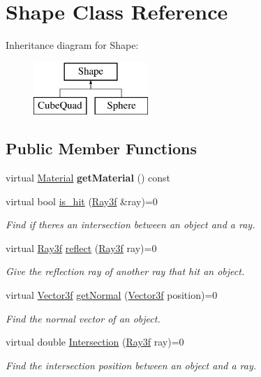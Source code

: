 \hypertarget{class_shape}{}\section{Shape Class Reference}
\label{class_shape}
Inheritance diagram for Shape\+:\begin{figure}[H]
\begin{center}
\leavevmode
\includegraphics[height=2.000000cm]{class_shape}
\end{center}
\end{figure}
\subsection*{Public Member Functions}
\begin{DoxyCompactItemize}
\item 
\mbox{\label{class_shape_ac4d71163e542213ea286344300e16c6f}} 
virtual \mbox{\hyperlink{class_material}{Material}} {\bfseries get\+Material} () const
\item 
virtual bool \mbox{\hyperlink{class_shape_ab443b81b74cfb1d248d23cc049da7ddd}{is\+\_\+hit}} (\mbox{\hyperlink{class_ray3f}{Ray3f}} \&ray)=0
\begin{DoxyCompactList}\small\item\em Find if there\textquotesingle{}s an intersection between an object and a ray. \end{DoxyCompactList}\item 
virtual \mbox{\hyperlink{class_ray3f}{Ray3f}} \mbox{\hyperlink{class_shape_a7cc30a4c8e9564c51f6ab36554aa5cfc}{reflect}} (\mbox{\hyperlink{class_ray3f}{Ray3f}} ray)=0
\begin{DoxyCompactList}\small\item\em Give the reflection ray of another ray that hit an object. \end{DoxyCompactList}\item 
virtual \mbox{\hyperlink{class_vector3f}{Vector3f}} \mbox{\hyperlink{class_shape_afba80076ff9eb95f7e7c4144e323590f}{get\+Normal}} (\mbox{\hyperlink{class_vector3f}{Vector3f}} position)=0
\begin{DoxyCompactList}\small\item\em Find the normal vector of an object. \end{DoxyCompactList}\item 
virtual double \mbox{\hyperlink{class_shape_aae1d31ff6fb4237397bf11afd07d7e48}{Intersection}} (\mbox{\hyperlink{class_ray3f}{Ray3f}} ray)=0
\begin{DoxyCompactList}\small\item\em Find the intersection position between an object and a ray. \end{DoxyCompactList}\end{DoxyCompactItemize}
